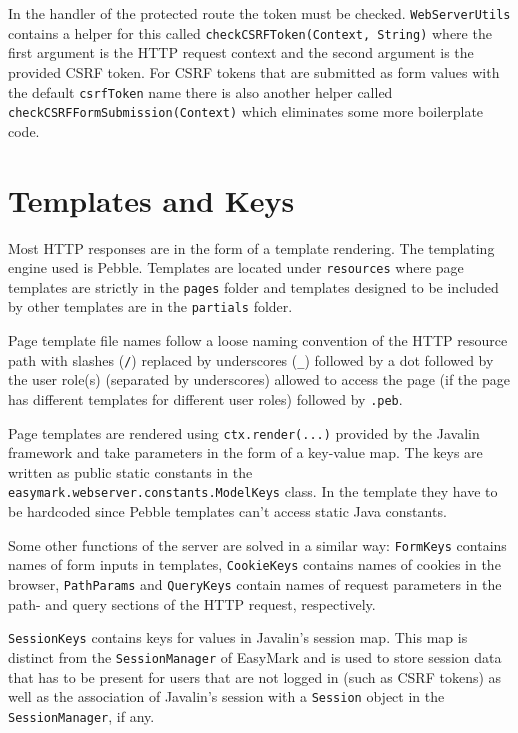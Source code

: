 \documentclass[12pt,a4paper]{report}
\begin{document}
	In the handler of the protected route the token must be checked. \lstinline|WebServerUtils| contains a helper for this called \lstinline|checkCSRFToken(Context, String)| where the first argument is the HTTP request context and the second argument is the provided CSRF token. For CSRF tokens that are submitted as form values with the default \lstinline|csrfToken| name there is also another helper called \lstinline|checkCSRFFormSubmission(Context)| which eliminates some more boilerplate code.
	
	\section{Templates and Keys}
	Most HTTP responses are in the form of a template rendering. The templating engine used is Pebble. Templates are located under \lstinline|resources| where page templates are strictly in the \lstinline|pages| folder and templates designed to be included by other templates are in the \lstinline|partials| folder.
	
	Page template file names follow a loose naming convention of the HTTP resource path with slashes (\lstinline|/|) replaced by underscores (\lstinline|_|) followed by a dot followed by the user role(s) (separated by underscores) allowed to access the page (if the page has different templates for different user roles) followed by \lstinline|.peb|.
	
	Page templates are rendered using \lstinline|ctx.render(...)| provided by the Javalin framework and take parameters in the form of a key-value map. The keys are written as public static constants in the \lstinline|easymark.webserver.constants.ModelKeys| class. In the template they have to be hardcoded since Pebble templates can't access static Java constants.
	
	Some other functions of the server are solved in a similar way: \lstinline|FormKeys| contains names of form inputs in templates, \lstinline|CookieKeys| contains names of cookies in the browser, \lstinline|PathParams| and \lstinline|QueryKeys| contain names of request parameters in the path- and query sections of the HTTP request, respectively.

	\lstinline|SessionKeys| contains keys for values in Javalin's session map. This map is distinct from the \lstinline|SessionManager| of EasyMark and is used to store session data that has to be present for users that are not logged in (such as CSRF tokens) as well as the association of Javalin's session with a \lstinline|Session| object in the \lstinline|SessionManager|, if any.
	
\end{document}
